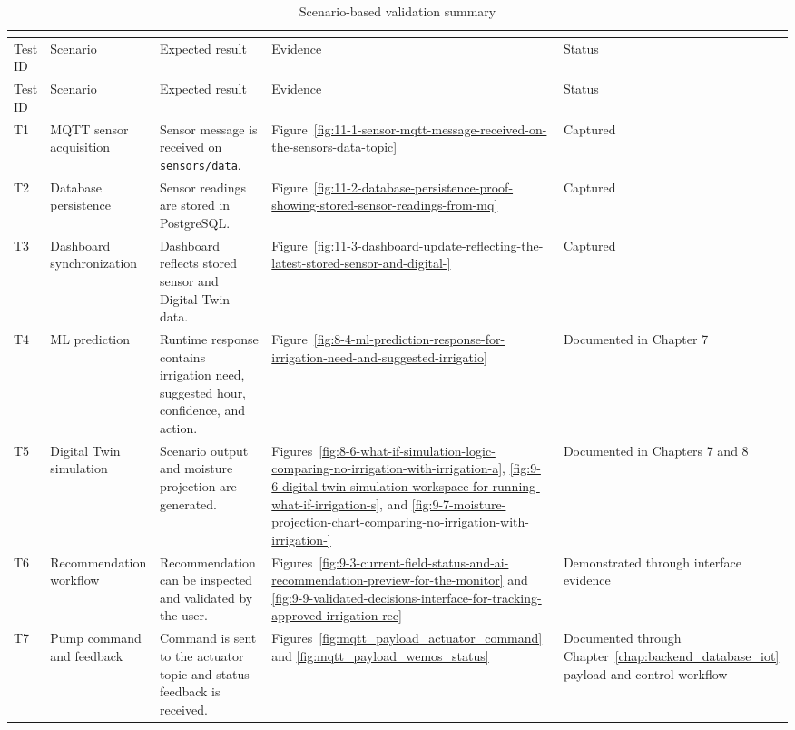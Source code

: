 \begin{footnotesize}
\setlength{\tabcolsep}{2pt}
\begin{longtable}{@{}>{\raggedright\arraybackslash}p{}>{\raggedright\arraybackslash}p{}>{\raggedright\arraybackslash}p{}>{\raggedright\arraybackslash}p{}>{\raggedright\arraybackslash}p{}@{}}
\caption{Scenario-based validation summary}\\
\label{tab:scenario_validation_summary}\\
\toprule
Test ID & Scenario & Expected result & Evidence & Status \\
\midrule
\endfirsthead
\toprule
Test ID & Scenario & Expected result & Evidence & Status \\
\midrule
\endhead
T1 & MQTT sensor acquisition & Sensor message is received on \texttt{sensors/data}. & Figure~\ref{fig:11-1-sensor-mqtt-message-received-on-the-sensors-data-topic} & Captured \\
T2 & Database persistence & Sensor readings are stored in PostgreSQL. & Figure~\ref{fig:11-2-database-persistence-proof-showing-stored-sensor-readings-from-mq} & Captured \\
T3 & Dashboard synchronization & Dashboard reflects stored sensor and Digital Twin data. & Figure~\ref{fig:11-3-dashboard-update-reflecting-the-latest-stored-sensor-and-digital-} & Captured \\
T4 & ML prediction & Runtime response contains irrigation need, suggested hour, confidence, and action. & Figure~\ref{fig:8-4-ml-prediction-response-for-irrigation-need-and-suggested-irrigatio} & Documented in Chapter 7 \\
T5 & Digital Twin simulation & Scenario output and moisture projection are generated. & Figures~\ref{fig:8-6-what-if-simulation-logic-comparing-no-irrigation-with-irrigation-a}, \ref{fig:9-6-digital-twin-simulation-workspace-for-running-what-if-irrigation-s}, and \ref{fig:9-7-moisture-projection-chart-comparing-no-irrigation-with-irrigation-} & Documented in Chapters 7 and 8 \\
T6 & Recommendation workflow & Recommendation can be inspected and validated by the user. & Figures~\ref{fig:9-3-current-field-status-and-ai-recommendation-preview-for-the-monitor} and \ref{fig:9-9-validated-decisions-interface-for-tracking-approved-irrigation-rec} & Demonstrated through interface evidence \\
T7 & Pump command and feedback & Command is sent to the actuator topic and status feedback is received. & Figures~\ref{fig:mqtt_payload_actuator_command} and \ref{fig:mqtt_payload_wemos_status} & Documented through Chapter~\ref{chap:backend_database_iot} payload and control workflow \\

\end{longtable}
\end{footnotesize}
